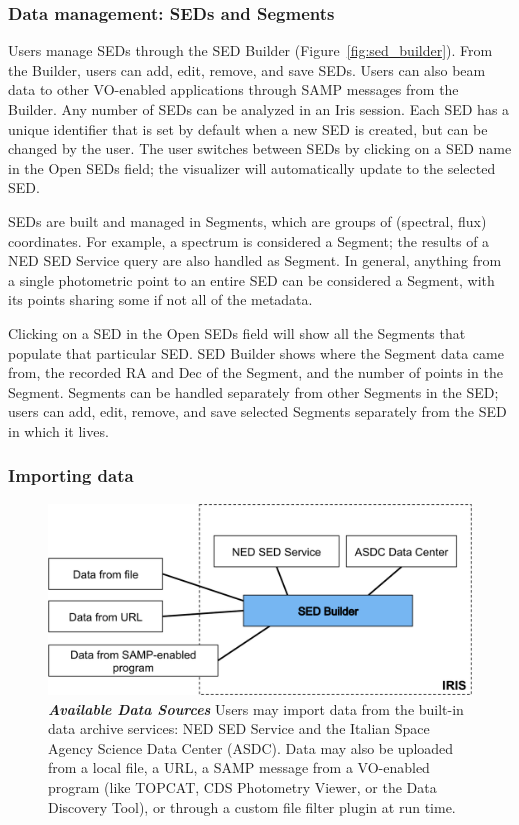 \documentclass[5p]{elsarticle}
\begin{document}
\subsubsection{Data management: SEDs and Segments}
Users manage SEDs through the SED Builder (Figure~\ref{fig:sed_builder}). From the Builder, users can add, edit, remove, and save SEDs. Users can also beam data to other VO-enabled applications through SAMP messages from the Builder. Any number of SEDs can be analyzed in an Iris session. Each SED has a unique identifier that is set by default when a new SED is created, but can be changed by the user. The user switches between SEDs by clicking on a SED name in the Open SEDs field; the visualizer will automatically update to the selected SED.

SEDs are built and managed in Segments, which are groups of (spectral, flux) coordinates. For example, a spectrum is considered a Segment; the results of a NED SED Service query are also handled as Segment. In general, anything from a single photometric point to an entire SED can be considered a Segment, with its points sharing some if not all of the metadata.

Clicking on a SED in the Open SEDs field will show all the Segments that populate that particular SED. SED Builder shows where the Segment data came from, the recorded RA and Dec of the Segment, and the number of points in the Segment. Segments can be handled separately from other Segments in the SED; users can add, edit, remove, and save selected Segments separately from the SED in which it lives.

\subsubsection{Importing data}

\begin{figure}
\begin{center}
\includegraphics[width=\columnwidth]{figures/iris_data_sources2.png}
\caption{\textit{\textbf{\label{fig:data_sources} Available Data Sources}}\textit{}\textbf{}\textit{} Users may import data from the built-in data archive services: NED SED Service and the Italian Space Agency Science Data Center (ASDC). Data may also be uploaded from a local file, a URL, a SAMP message from a VO-enabled program (like TOPCAT, CDS Photometry Viewer, or the Data Discovery Tool), or through a custom file filter plugin at run time.}
\end{center}
\end{figure}
\end{document}
